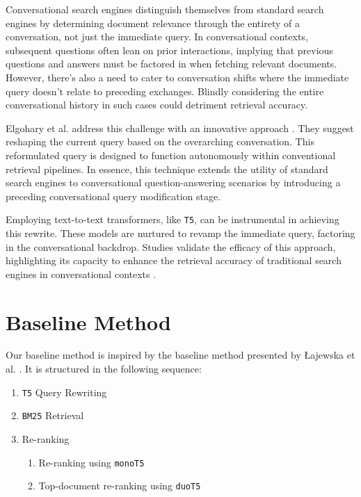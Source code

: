 \documentclass[sigconf]{acmart}
\begin{document}
Conversational search engines distinguish themselves from standard search engines by determining document relevance through the entirety of a conversation, not just the immediate query. In conversational contexts, subsequent questions often lean on prior interactions, implying that previous questions and answers must be factored in when fetching relevant documents. However, there's also a need to cater to conversation shifts where the immediate query doesn't relate to preceding exchanges. Blindly considering the entire conversational history in such cases could detriment retrieval accuracy.

Elgohary et al. address this challenge with an innovative approach \cite{elgohary2019can}. They suggest reshaping the current query based on the overarching conversation. This reformulated query is designed to function autonomously within conventional retrieval pipelines. In essence, this technique extends the utility of standard search engines to conversational question-answering scenarios by introducing a preceding conversational query modification stage.

Employing text-to-text transformers, like \texttt{T5}, can be instrumental in achieving this rewrite. These models are nurtured to revamp the immediate query, factoring in the conversational backdrop. Studies validate the efficacy of this approach, highlighting its capacity to enhance the retrieval accuracy of traditional search engines in conversational contexts \cite{elgohary2019can,anantha2020open,Lajewska:2023:ECIR}.



\section{Baseline Method}\label{sec:baseline}
Our baseline method is inspired by the baseline method presented by Łajewska et al. \cite{Lajewska:2023:ECIR}. It is structured in the following sequence:
\begin{enumerate}
	\item	\texttt{T5} Query Rewriting
	\item	\texttt{BM25} Retrieval
	\item	Re-ranking
			\begin{enumerate}
				\item	Re-ranking using \texttt{monoT5}
				\item	Top-document re-ranking using \texttt{duoT5}
			\end{enumerate}
\end{enumerate}
\end{document}
